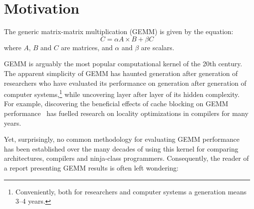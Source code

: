 \documentclass{acm_proc_article-sp} %
\begin{document}




\section{Motivation}

The generic matrix-matrix multiplication (GEMM) is given by the equation:
%
\begin{displaymath} C = \alpha A \times B + \beta C \end{displaymath}
%
\noindent where $A$, $B$ and $C$ are matrices, and $\alpha$ and $\beta$ are
scalars.

GEMM is arguably the most popular computational kernel of the 20th century.
%
The apparent simplicity of GEMM has haunted generation after generation of
researchers who have evaluated its performance on generation after generation
of computer systems,\footnote{Conveniently, both for researchers and computer
systems a generation means 3--4 years.} while uncovering layer after layer of
its hidden complexity.
%
For example, discovering the beneficial effects of cache blocking on GEMM
performance~\cite{Lam:1991} has fuelled research on locality optimizations in
compilers for many years.

%
Yet, surprisingly, no common methodology for evaluating GEMM performance has
been established over the many decades of using this kernel for comparing
architectures, compilers and ninja-class programmers.
%
Consequently, the reader of a report presenting GEMM results is often left wondering:
\end{document}
